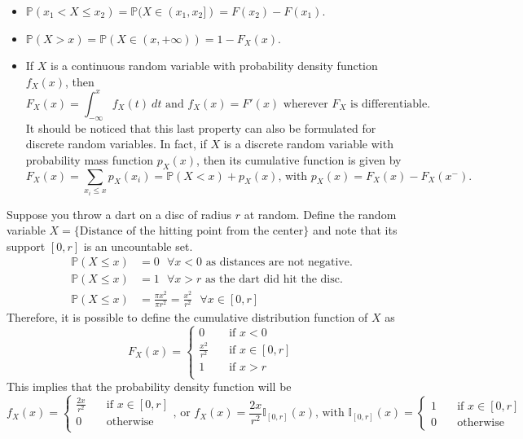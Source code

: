 \documentclass{report}
\begin{document}
\begin{itemize}
    \item $\displaystyle \mathbb{P}(x_1 < X \leq x_2) = \mathbb{P}(X \in (x_1, x_2]) = F(x_2) - F(x_1)$.
    \item $\displaystyle \mathbb{P}(X > x) = \mathbb{P}(X \in (x, +\infty)) = 1 - F_X(x)$.
    \item If $\displaystyle X$ is a continuous random variable with probability density function $\displaystyle f_X(x)$, then
    \[F_X(x) = \int_{-\infty}^x f_X(t) \ dt \text{ and } f_X(x) = F'(x) \text{ wherever $F_X$ is differentiable.}\]
    It should be noticed that this last property can also be formulated for discrete random variables. \newline
    In fact, if $\displaystyle X$ is a discrete random variable with probability mass function $\displaystyle p_X(x)$, then its cumulative function is given by
    \[F_X(x) =\sum_{x_i \leq x} p_X(x_i) = \mathbb{P}(X < x) + p_X(x) \text{, with $p_X(x) = F_X(x) - F_X(x^-)$.}\]
\end{itemize}
\begin{examplebox}
    Suppose you throw a dart on a disc of radius $\displaystyle r$ at random. \newline
    Define the random variable $\displaystyle X = \{\text{Distance of the hitting point from the center}\}$ and note that its support $\displaystyle [0, r]$ is an uncountable set.
    \begin{align*}
        \mathbb{P}(X \leq x) &= 0 \text{ } \forall x < 0 \text{ as distances are not negative.} \\
        \mathbb{P}(X \leq x) &= 1 \text{ } \forall x > r \text{ as the dart did hit the disc.} \\
        \mathbb{P}(X \leq x) &= \frac{\pi x^2}{\pi r^2} = \frac{x^2}{r^2} \text{ } \forall x \in [0, r]
    \end{align*}
    Therefore, it is possible to define the cumulative distribution function of $\displaystyle X$ as
    \[F_X(x) = \begin{cases}
        0 &\quad\text{if $x < 0$} \\
        \frac{x^2}{r^2} &\quad\text{if $x \in [0, r]$} \\
        1 &\quad\text{if $x > r$} \\
    \end{cases}\]
    This implies that the probability density function will be
    \[f_X(x) = \begin{cases}
        \frac{2x}{r^2} &\quad\text{if $x \in [0, r]$} \\
        0 &\quad\text{otherwise} \\
    \end{cases} \text{, or } f_X(x) = \frac{2x}{r^2}\mathbb{I}_{[0, r]}(x) \text{, with } \mathbb{I}_{[0, r]}(x) = \begin{cases}
        1 &\quad\text{if $x \in [0, r]$} \\
        0 &\quad\text{otherwise}
    \end{cases}\]
\end{examplebox}
\end{document}
